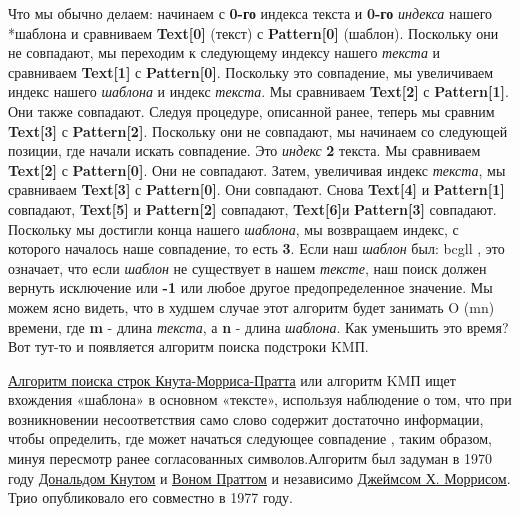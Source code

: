 Что мы обычно делаем: начинаем с \textbf{0-го} индекса текста и \textbf{0-го} \textit{индекса} нашего *шаблона и сравниваем
\textbf{Text[0]} (текст) с \textbf{Pattern[0]} (шаблон). Поскольку они не совпадают, мы переходим к следующему
индексу нашего \textit{текста} и сравниваем \textbf{Text[1]} с \textbf{Pattern[0]}. Поскольку это совпадение, мы увеличиваем
индекс нашего \textit{шаблона} и индекс \textit{текста}. Мы сравниваем \textbf{Text[2]} с \textbf{Pattern[1]}. Они также совпадают.
Следуя процедуре, описанной ранее, теперь мы сравним \textbf{Text[3]} с \textbf{Pattern[2]}. Поскольку они не
совпадают, мы начинаем со следующей позиции, где начали искать совпадение. Это \textit{индекс} \textbf{2} текста. Мы
сравниваем \textbf{Text[2]} с \textbf{Pattern[0]}. Они не совпадают. Затем, увеличивая индекс \textit{текста}, мы сравниваем
\textbf{Text[3]} с \textbf{Pattern[0]}. Они совпадают. Снова \textbf{Text[4]} и \textbf{Pattern[1]} совпадают, \textbf{Text[5]} и \textbf{Pattern[2]}
совпадают, \textbf{Text[6]}и \textbf{Pattern[3]} совпадают. Поскольку мы достигли конца нашего \textit{шаблона}, мы
возвращаем индекс, с которого началось наше совпадение, то есть \textbf{3}. Если наш \textit{шаблон} был: bcgll %
, это
означает, что если \textit{шаблон} не существует в нашем \textit{тексте}, наш поиск должен вернуть исключение или \textbf{-1}
или любое другое предопределенное значение. Мы можем ясно видеть, что в худшем случае этот
алгоритм будет занимать O (mn) %
времени, где \textbf{m} - длина \textit{текста}, а \textbf{n} - длина \textit{шаблона}. Как уменьшить это
время? Вот тут-то и появляется алгоритм поиска подстроки KMП.
\vspace{\baselineskip}

\href{https://en.wikipedia.org/wiki/Knuth%
}
{\underline {Алгоритм поиска строк Кнута-Морриса-Пратта}}
или алгоритм KMП ищет вхождения «шаблона» в
основном «тексте», используя наблюдение о том, что при возникновении несоответствия само слово
содержит достаточно информации, чтобы определить, где может начаться следующее совпадение ,
таким образом, минуя пересмотр ранее согласованных символов.\newline Алгоритм был задуман в 1970 году
\href{https://en.wikipedia.org/wiki/Donald_Knuth}{\underline{Дональдом Кнутом}}
и \href{https://en.wikipedia.org/wiki/Vaughan_Pratt}{\underline{Воном Праттом}} и независимо \newline\href{https://en.wikipedia.org/wiki/James_H._Morris}{\underline{Джеймсом Х. Моррисом}}.
Трио опубликовало его совместно в 1977 году.
\vspace{\baselineskip}

